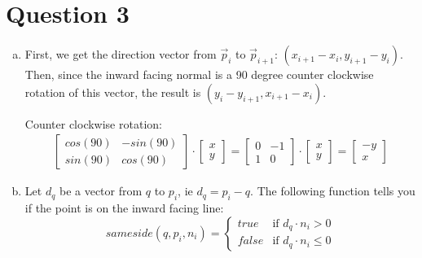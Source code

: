 \documentclass{article} %
\begin{document}

\section{Question 3}

\begin{enumerate}[a)]

\item

First, we get the direction vector from $\vec{p}_i$ to $\vec{p}_{i+1}$: $(x_{i+1} - x_i, y_{i+1} - y_i)$. Then, since the inward facing normal is a 90 degree counter clockwise rotation of this vector, the result is $(y_i - y_{i+1}, x_{i+1} - x_i)$.

Counter clockwise rotation:
\begin{align*}
\left[
\begin{matrix}
cos(90) & -sin(90)\\
sin(90) & cos(90)
\end{matrix}
\right]
\cdot
\left[
\begin{matrix}
x\\
y
\end{matrix}
\right] = \left[
\begin{matrix}
0 & -1\\
1 & 0
\end{matrix}
\right]
\cdot
\left[
\begin{matrix}
x\\
y
\end{matrix}
\right] = \left[
\begin{matrix}
-y\\
x
\end{matrix}
\right]
\end{align*}

\item
Let $d_q$ be a vector from $q$ to $p_i$, ie $d_q = p_i - q$. The following function tells you if the point is on the inward facing line:
\[
sameside(q, p_i, n_i) =
\begin{cases}
true & \text{if } d_q \cdot n_i > 0\\
false & \text{if } d_q \cdot n_i \leq 0
\end{cases}
\]


\end{enumerate}
\end{document}
